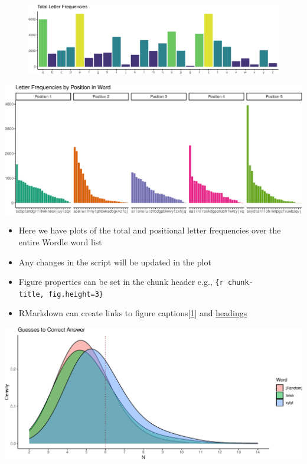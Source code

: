 \documentclass[
]{article}
\begin{document}
\begin{figure}
\centering
\includegraphics{report_files/figure-latex/letter-1.pdf}
\caption{\label{fig:fig-1}}
\end{figure}

\includegraphics{report_files/figure-latex/positional-1.pdf}

\begin{itemize}
\item
  Here we have plots of the total and positional letter frequencies over
  the entire Wordle word list
\item
  Any changes in the script will be updated in the plot
\item
  Figure properties can be set in the chunk header e.g.,
  \texttt{\{r\ chunk-title,\ fig.height=3\}}
\item
  RMarkdown can create links to figure captions{[}\ref{fig:fig-1}{]} and
  \protect\hyperlink{initial-setup}{headings}
\end{itemize}

\includegraphics{report_files/figure-latex/bootstrapping-1.pdf}
\end{document}
